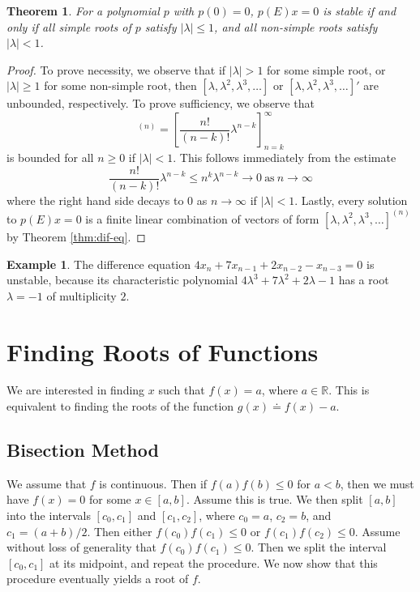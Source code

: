 \documentclass[12pt]{article}
\newcommand{\rr}{\mathbb{R}}
\theoremstyle{plain}
\newtheorem{theorem}{Theorem}
\theoremstyle{definition}
\newtheorem*{example}{Example}
\theoremstyle{remark}
\numberwithin{equation}{section}  %
\begin{document}
\begin{theorem}
For a polynomial $p$ with $p(0) = 0$, $p(E)x = 0$ is stable if and only if
all simple roots of $p$ satisfy $|\lambda| \le 1$, and all non-simple roots
satisfy $|\lambda| < 1$. 
\end{theorem}
\begin{proof}
To prove necessity, we observe that if $|\lambda| > 1$ for some simple root, or
$|\lambda| \ge 1$ for some non-simple root, then $[\lambda, \lambda^2, \lambda^3,
\ldots]$ or $[\lambda, \lambda^2, \lambda^3, \ldots]'$ are unbounded, respectively.
To prove sufficiency, we observe that
\begin{equation*}
[\lambda, \lambda^2, \lambda^3,
\ldots]^{(n)} = \left [ \frac{n!}{(n - k)!} \lambda^{n - k} \right ]_{n =
k}^{\infty} 
\end{equation*}
is bounded for all $n \ge 0$ if $|\lambda| < 1$. This follows immediately from
the estimate 
\begin{equation*}
\frac{n!}{(n - k)!} \lambda^{n - k}  \le n^{k} \lambda^{n-k} \to 0 \ \text{as} \
n \to \infty
\end{equation*}
where the right hand side decays to $0$ as $n \to \infty$ if $|\lambda| < 1$. Lastly,
every  solution to $p(E)x = 0$ is a finite linear combination of vectors of form
$[\lambda, \lambda^2, \lambda^3, \ldots]^{(n)}$ by Theorem \ref{thm:dif-eq}.
\end{proof}
\begin{example}
The difference equation $4x_n + 7x_{n-1} + 2 x_{n-2} - x_{n-3} = 0$ is
unstable, because its characteristic polynomial 
$4\lambda^{3} + 7\lambda^{2} + 2 \lambda - 1$ has a root $\lambda= -1$  
of multiplicity $2$.
\end{example}
\section{Finding Roots of Functions}
We are interested in finding $x$ such that
$f(x) = a$, where $a \in \rr$. This is equivalent to finding
the roots of the function $g(x) \doteq f(x) - a$.
\subsection{Bisection Method}
We assume that $f$ is continuous. Then if $f(a)f(b) \le 0$ for $a < b$,
then we must have $f(x) = 0$ for some $x \in [a,b]$. Assume this is true.
We then split
$[a,b]$ into the intervals $[c_0, c_1]$ and $[c_1, c_2]$, where $c_0 = a$, $c_2 = b$, and
$c_1 = (a + b)/2$. Then either $f(c_0)f(c_1) \le 0$ or $f(c_1)f(c_2) \le 0$.
Assume without loss of generality that $f(c_0)f(c_1) \le 0$. Then we
split the interval $[c_0, c_1]$ at its midpoint, and repeat the procedure. We
now show that this procedure eventually yields a root of $f$.  
\end{document}
